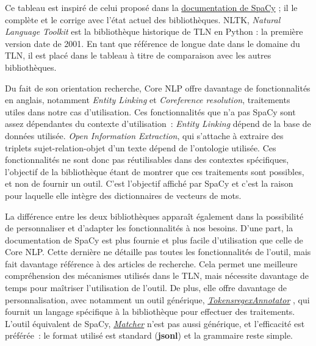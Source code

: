 Ce tableau est inspiré de celui proposé dans la \href{https://spacy.io/usage/facts-figures}{documentation de SpaCy} \cite{spacy-figures}; il le complète et le corrige avec l'état actuel des bibliothèques. NLTK, \textit{Natural Language Toolkit} est la bibliothèque historique de TLN en Python : la première version date de 2001. En tant que référence de longue date dans le domaine du TLN, il est placé dans le tableau à titre de comparaison avec les autres bibliothèques.
\newline

Du fait de son orientation recherche, Core NLP offre davantage de fonctionnalités en anglais, notamment \textit{Entity Linking} et \textit{Coreference resolution}, traitements utiles dans notre cas d'utilisation. Ces fonctionnalités que n'a pas SpaCy sont assez dépendantes du contexte d'utilisation~: \textit{Entity Linking} dépend de la base de données utilisée. \textit{Open Information Extraction}, qui s'attache à extraire des triplets sujet-relation-objet d'un texte dépend de l'ontologie utilisée. Ces fonctionnalités ne sont donc pas réutilisables dans des contextes spécifiques, l'objectif de la bibliothèque étant de montrer que ces traitements sont possibles, et non de fournir un outil. C'est l'objectif affiché par SpaCy et c'est la raison pour laquelle elle intègre des dictionnaires de vecteurs de mots.
\newline

La différence entre les deux bibliothèques apparaît également dans la possibilité de personnaliser et d'adapter les fonctionnalités à nos besoins. D'une part, la documentation de SpaCy est plus fournie et plus facile d'utilisation que celle de Core NLP. Cette dernière ne détaille pas toutes les fonctionnalités de l'outil, mais fait davantage référence à des articles de recherche. Cela permet une meilleure compréhension des mécanismes utilisés dans le TLN, mais nécessite davantage de temps pour maîtriser l'utilisation de l'outil. De plus, elle offre  davantage de personnalisation, avec notamment un outil générique, \href{https://stanfordnlp.github.io/CoreNLP/tokensregex.html}{\textit{TokensregexAnnotator}} \cite{corenlp-tokensreg}, qui fournit un langage spécifique à la bibliothèque pour effectuer des traitements. L'outil équivalent de SpaCy, \href{https://spacy.io/usage/rule-based-matching}{\textit{Matcher}} \cite{spacy-ruler} n'est pas aussi générique, et l'efficacité est préférée~: le format utilisé est standard (\textbf{jsonl}) et la grammaire reste simple.
\newline

